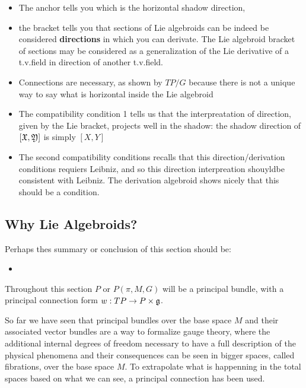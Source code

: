 \begin{itemize}
    \item The anchor tells you which is the horizontal shadow direction,
    \item the bracket tells you that sections of Lie algebroids can be indeed be considered \textbf{directions} in which you can derivate. The Lie algebroid bracket of sections may be considered as a generalization of the Lie derivative of a t.v.field in direction of another t.v.field.
    \item Connections are necessary, as shown by $TP/G$ because there is not a unique way to say what is horizontal inside the Lie algebroid
    \item The compatibility condition 1 tells us that the interpreatation of direction, given by the Lie bracket, projects well in the shadow: the shadow direction of $[\mathfrak{X}, \mathfrak{Y}]$ is simply $[X, Y]$
    \item The second compatibility conditions recalls that this direction/derivation conditions requiers Leibniz, and so this direction interpreation shouyldbe consistent with Leibniz. The derivation algebroid shows nicely that this should be a condition.
\end{itemize} 


\subsection{Why Lie Algebroids?}

Perhaps thes summary or conclusion of this section should be:
\begin{itemize}
    \item 
\end{itemize}

Throughout this section $P$ or $P(\pi, M, G)$ will be a principal bundle, with a principal connection form $w : TP \to P \times \mathfrak{g}$.  

So far we have seen that principal bundles over the base space $M$ and their associated vector bundles are a way to formalize gauge theory, where the additional internal degrees of freedom necessary to have a full description of the physical phenomena and their consequences can be seen in bigger spaces, called fibrations, over the base space $M$. To extrapolate what is happenning in the total spaces based on what we can see, a principal connection has been used. 

